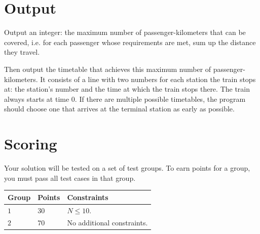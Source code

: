 \section*{Output}
Output an integer: the maximum number of passenger-kilometers that can be covered, i.e. for each
passenger whose requirements are met, sum up the distance they travel. 

Then output the timetable that achieves this maximum number of passenger-kilometers. It consists
of a line with two numbers for each station the train stops at: the station's number and the time
at which the train stops there. The train always starts at time 0. If there are multiple possible timetables,
the program should choose one that arrives at the terminal station as early as possible.

\section*{Scoring}
Your solution will be tested on a set of test groups.
To earn points for a group, you must pass all test cases in that group.

\noindent
\begin{tabular}{| l | l | p{12cm} |}
  \hline
  \textbf{Group} & \textbf{Points} & \textbf{Constraints} \\ \hline
  $1$    & $30$        & $N \leq 10$. \\ \hline 
  $2$    & $70$        & No additional constraints. \\ \hline 
\end{tabular}
